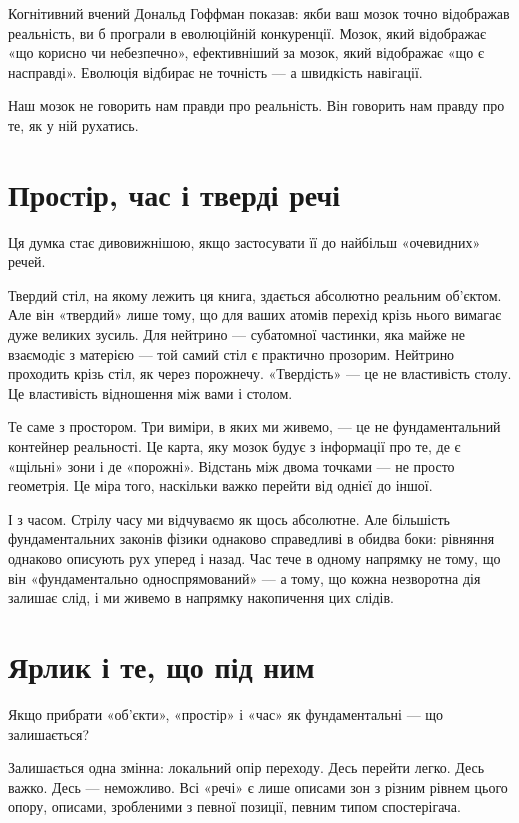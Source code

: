 \documentclass[12pt, a4paper, openany]{book}
\begin{document}
Когнітивний вчений Дональд Гоффман показав: якби ваш мозок точно відображав реальність, ви б програли в еволюційній конкуренції. Мозок, який відображає «що корисно чи небезпечно», ефективніший за мозок, який відображає «що є насправді». Еволюція відбирає не точність --- а швидкість навігації.

Наш мозок не говорить нам правди про реальність. Він говорить нам правду про те, як у ній рухатись.

\section{Простір, час і тверді речі}

Ця думка стає дивовижнішою, якщо застосувати її до найбільш «очевидних» речей.

Твердий стіл, на якому лежить ця книга, здається абсолютно реальним об'єктом. Але він «твердий» лише тому, що для ваших атомів перехід крізь нього вимагає дуже великих зусиль. Для нейтрино --- субатомної частинки, яка майже не взаємодіє з матерією --- той самий стіл є практично прозорим. Нейтрино проходить крізь стіл, як через порожнечу. «Твердість» --- це не властивість столу. Це властивість відношення між вами і столом.

Те саме з простором. Три виміри, в яких ми живемо, --- це не фундаментальний контейнер реальності. Це карта, яку мозок будує з інформації про те, де є «щільні» зони і де «порожні». Відстань між двома точками --- не просто геометрія. Це міра того, наскільки важко перейти від однієї до іншої.

І з часом. Стрілу часу ми відчуваємо як щось абсолютне. Але більшість фундаментальних законів фізики однаково справедливі в обидва боки: рівняння однаково описують рух уперед і назад. Час тече в одному напрямку не тому, що він «фундаментально односпрямований» --- а тому, що кожна незворотна дія залишає слід, і ми живемо в напрямку накопичення цих слідів.

\section{Ярлик і те, що під ним}

Якщо прибрати «об'єкти», «простір» і «час» як фундаментальні --- що залишається?

Залишається одна змінна: локальний опір переходу. Десь перейти легко. Десь важко. Десь --- неможливо. Всі «речі» є лише описами зон з різним рівнем цього опору, описами, зробленими з певної позиції, певним типом спостерігача.
\end{document}
